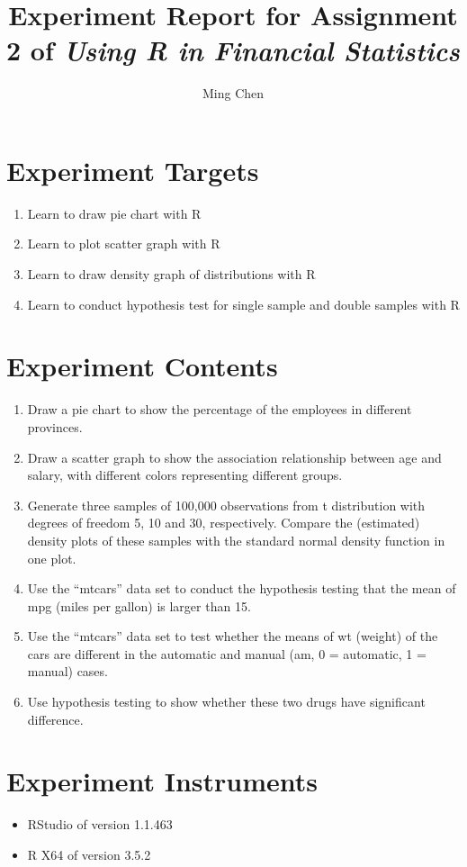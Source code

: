 \documentclass[12pt]{article}
\author{Ming Chen}
\title{Experiment Report for Assignment 2 of \textit{Using R in Financial Statistics}}
\begin{document}
\maketitle

\setlength{\parskip}{0.5\baselineskip}
\section{Experiment Targets}
\begin{enumerate}
	\item Learn to draw pie chart with R
	\item Learn to plot scatter graph with R
	\item Learn to draw density graph of distributions with R
	\item Learn to conduct hypothesis test for single sample and double samples with R
\end{enumerate}

\section{Experiment Contents}
\begin{enumerate}
	\item Draw a pie chart to show the percentage of the employees in different provinces. \\
	\item Draw a scatter graph to show the association relationship between age and salary, with different colors representing different groups. 
	\item Generate three samples of 100,000 observations from t distribution with degrees of freedom 5, 10 and 30, respectively. Compare the  (estimated) density plots of these samples with the standard normal density function in one plot. 
	\item Use the “mtcars” data set to conduct the hypothesis testing that the mean of mpg (miles per gallon) is larger than 15.
	\item Use the “mtcars” data set to test whether the means of wt (weight) of the cars are different in the automatic and manual (am, 0 = automatic, 1 = manual) cases.
	\item Use hypothesis testing to show whether these two drugs have significant difference.
\end{enumerate} 

\section{Experiment Instruments}
\begin{itemize}
	\item RStudio of version 1.1.463\\
	\item R X64 of version 3.5.2\\
\end{itemize}
\end{document}

